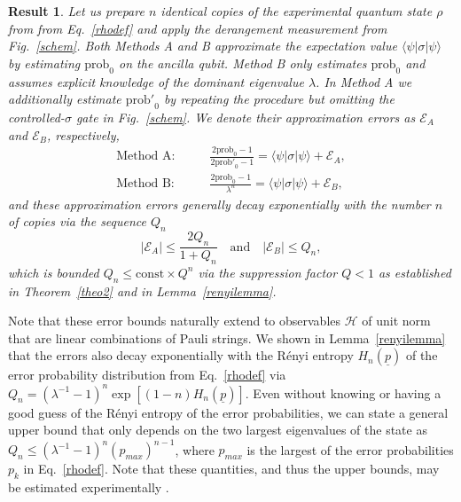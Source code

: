 \documentclass[aps,prx,showpacs,twocolumn,reprint]{revtex4-2}
\newtheorem{result}{Result}
\newcommand{\prob}{\mathrm{prob}_0}
\newcommand{\qn}{Q_n}
\begin{document}
 
\begin{result}\label{result1}
		Let us prepare $n$ identical copies of the experimental quantum state
	 $\rho$ from from Eq.~\eqref{rhodef} and apply the derangement measurement
	 from Fig.~\ref{schem}. Both Methods A and B
	 approximate the expectation value $\langle\psi |\sigma | \psi \rangle$
	 by estimating $\prob$ on the ancilla qubit.
	 Method B only estimates $\prob$ and assumes explicit knowledge of the dominant eigenvalue $\lambda$. 
	 In Method A we additionally estimate $\mathrm{prob'}_0$ by repeating the procedure but
	 omitting the controlled-$\sigma$ gate in Fig.~\ref{schem}.
	 We denote their approximation errors as $\mathcal{E}_A$ and $\mathcal{E}_B$, respectively,
	 \begin{align}
	 \text{Method A:}& \quad \quad  \frac{2\mathrm{prob}_0-1}{2\mathrm{prob'}_0-1} = \langle\psi |\sigma | \psi \rangle + \mathcal{E}_A,\\
	 \text{Method B:}& \quad \quad \frac{2\mathrm{prob}_0-1}{\lambda^n} = \langle\psi |\sigma | \psi \rangle + \mathcal{E}_B,
	 \end{align} 
	and these approximation errors generally decay exponentially with the number $n$ of copies via the sequence $Q_n$
	\begin{equation}
	|\mathcal{E}_A| \leq \frac{ 2 \qn}{1+\qn} \quad \text{and} \quad |\mathcal{E}_B| \leq \qn,
	\end{equation}
	which is bounded $\qn \leq  \mathrm{const}\times Q^n$ via the suppression factor $Q < 1$  as established in
	Theorem~\ref{theo2} and in Lemma~\ref{renyilemma}.
\end{result}
Note that these error bounds naturally extend to observables $\mathcal{H}$ of unit
norm that are linear combinations of Pauli strings.
We shown in Lemma~\ref{renyilemma} that the errors also decay exponentially with
the R{\'e}nyi entropy $H_n(\underline{p})$ of the
error probability distribution from Eq.~\eqref{rhodef}  via
$\qn =  (\lambda^{-1}{-}1)^n \exp[ (1{-}n) H_n(\underline{p}) ]$.
Even without knowing or having a good guess of the R{\'e}nyi entropy of the error probabilities,
we can state a general upper bound that only depends on the two largest eigenvalues of the state
as $\qn \leq (\lambda^{-1}{-}1)^n (p_{max})^{n-1}$, where $p_{max}$ is the largest of the
error probabilities $p_k$ in Eq.~\eqref{rhodef}. Note that these quantities, and thus the upper bounds, may
be estimated experimentally \cite{ekert2002direct, PhysRevA.64.052311, marvian2014generalization, 9163139, PhysRevA.89.012117,christandl2007nonzero,christandl2006spectra}.
\end{document}
